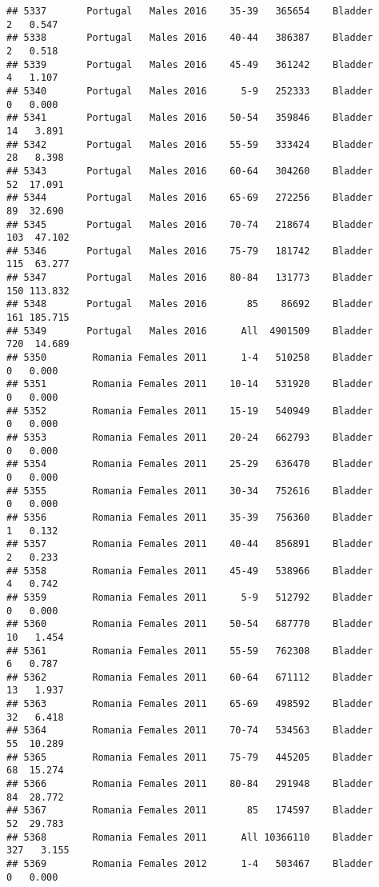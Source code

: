 \documentclass[
]{article}
\begin{document}
\begin{verbatim}
## 5337       Portugal   Males 2016    35-39   365654    Bladder      2   0.547
## 5338       Portugal   Males 2016    40-44   386387    Bladder      2   0.518
## 5339       Portugal   Males 2016    45-49   361242    Bladder      4   1.107
## 5340       Portugal   Males 2016      5-9   252333    Bladder      0   0.000
## 5341       Portugal   Males 2016    50-54   359846    Bladder     14   3.891
## 5342       Portugal   Males 2016    55-59   333424    Bladder     28   8.398
## 5343       Portugal   Males 2016    60-64   304260    Bladder     52  17.091
## 5344       Portugal   Males 2016    65-69   272256    Bladder     89  32.690
## 5345       Portugal   Males 2016    70-74   218674    Bladder    103  47.102
## 5346       Portugal   Males 2016    75-79   181742    Bladder    115  63.277
## 5347       Portugal   Males 2016    80-84   131773    Bladder    150 113.832
## 5348       Portugal   Males 2016       85    86692    Bladder    161 185.715
## 5349       Portugal   Males 2016      All  4901509    Bladder    720  14.689
## 5350        Romania Females 2011      1-4   510258    Bladder      0   0.000
## 5351        Romania Females 2011    10-14   531920    Bladder      0   0.000
## 5352        Romania Females 2011    15-19   540949    Bladder      0   0.000
## 5353        Romania Females 2011    20-24   662793    Bladder      0   0.000
## 5354        Romania Females 2011    25-29   636470    Bladder      0   0.000
## 5355        Romania Females 2011    30-34   752616    Bladder      0   0.000
## 5356        Romania Females 2011    35-39   756360    Bladder      1   0.132
## 5357        Romania Females 2011    40-44   856891    Bladder      2   0.233
## 5358        Romania Females 2011    45-49   538966    Bladder      4   0.742
## 5359        Romania Females 2011      5-9   512792    Bladder      0   0.000
## 5360        Romania Females 2011    50-54   687770    Bladder     10   1.454
## 5361        Romania Females 2011    55-59   762308    Bladder      6   0.787
## 5362        Romania Females 2011    60-64   671112    Bladder     13   1.937
## 5363        Romania Females 2011    65-69   498592    Bladder     32   6.418
## 5364        Romania Females 2011    70-74   534563    Bladder     55  10.289
## 5365        Romania Females 2011    75-79   445205    Bladder     68  15.274
## 5366        Romania Females 2011    80-84   291948    Bladder     84  28.772
## 5367        Romania Females 2011       85   174597    Bladder     52  29.783
## 5368        Romania Females 2011      All 10366110    Bladder    327   3.155
## 5369        Romania Females 2012      1-4   503467    Bladder      0   0.000

\end{verbatim}
\end{document}
